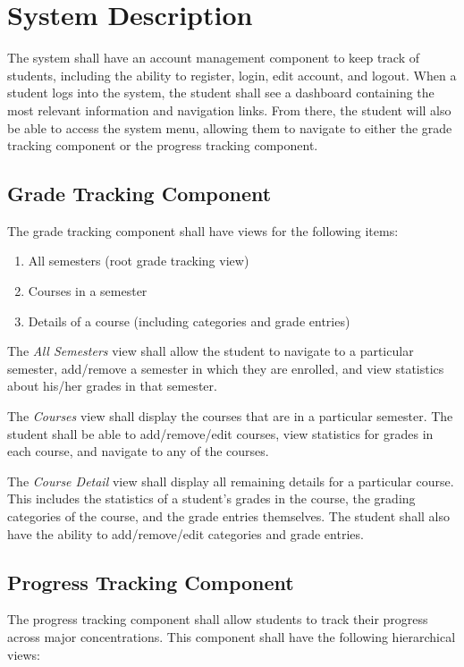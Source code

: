 \documentclass[12pt]{article}
\begin{document}
\section{System Description}
The system shall have an account management component to keep track of students, including the
ability to register, login, edit account, and logout. When a student logs into the system, the
student shall see a dashboard containing the most relevant information and navigation links. From
there, the student will also be able to access the system menu, allowing them to navigate to either
the grade tracking component or the progress tracking component.

\subsection{Grade Tracking Component}
\noindent
The grade tracking component shall have views for the following items:

\begin{enumerate}
    \item All semesters (root grade tracking view)
    \item Courses in a semester
    \item Details of a course (including categories and grade entries)
\end{enumerate}

The \textit{All Semesters} view shall allow the student to navigate to a particular semester,
add/remove a semester in which they are enrolled, and view statistics about his/her grades in that
semester.

The \textit{Courses} view shall display the courses that are in a particular semester. The student
shall be able to add/remove/edit courses, view statistics for grades in each course, and navigate
to any of the courses.

The \textit{Course Detail} view shall display all remaining details for a particular course. This
includes the statistics of a student's grades in the course, the grading categories of the course,
and the grade entries themselves. The student shall also have the ability to add/remove/edit
categories and grade entries.

\subsection{Progress Tracking Component}
\noindent
The progress tracking component shall allow students to track their progress across major
concentrations. This component shall have the following hierarchical views:
\end{document}
